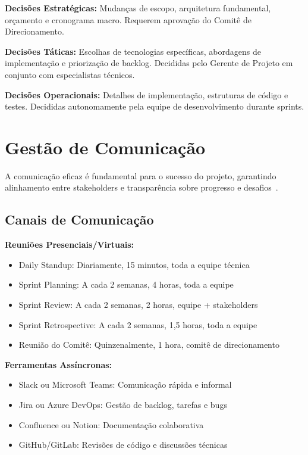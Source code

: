 \textbf{Decisões Estratégicas:} Mudanças de escopo, arquitetura fundamental, orçamento e cronograma macro. Requerem aprovação do Comitê de Direcionamento.

\textbf{Decisões Táticas:} Escolhas de tecnologias específicas, abordagens de implementação e priorização de backlog. Decididas pelo Gerente de Projeto em conjunto com especialistas técnicos.

\textbf{Decisões Operacionais:} Detalhes de implementação, estruturas de código e testes. Decididas autonomamente pela equipe de desenvolvimento durante sprints.

\section{Gestão de Comunicação}

A comunicação eficaz é fundamental para o sucesso do projeto, garantindo alinhamento entre stakeholders e transparência sobre progresso e desafios~\cite{PMI:2021}.

\subsection{Canais de Comunicação}

\textbf{Reuniões Presenciais/Virtuais:}
\begin{itemize}
    \item Daily Standup: Diariamente, 15 minutos, toda a equipe técnica
    \item Sprint Planning: A cada 2 semanas, 4 horas, toda a equipe
    \item Sprint Review: A cada 2 semanas, 2 horas, equipe + stakeholders
    \item Sprint Retrospective: A cada 2 semanas, 1,5 horas, toda a equipe
    \item Reunião do Comitê: Quinzenalmente, 1 hora, comitê de direcionamento
\end{itemize}

\textbf{Ferramentas Assíncronas:}
\begin{itemize}
    \item Slack ou Microsoft Teams: Comunicação rápida e informal
    \item Jira ou Azure DevOps: Gestão de backlog, tarefas e bugs
    \item Confluence ou Notion: Documentação colaborativa
    \item GitHub/GitLab: Revisões de código e discussões técnicas
\end{itemize}

